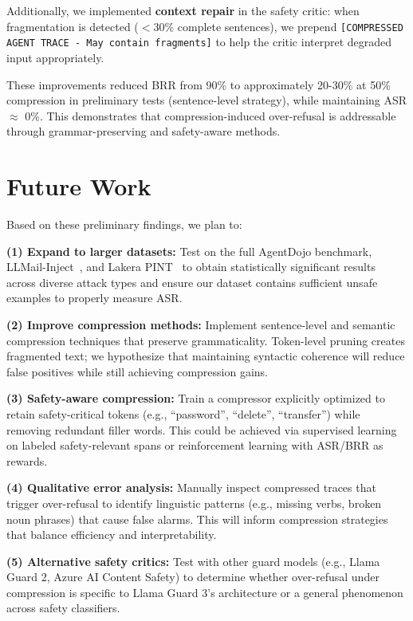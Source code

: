 \documentclass[11pt]{article}
\begin{document}
\noindent Additionally, we implemented \textbf{context repair} in the safety critic: when fragmentation is detected ($<$30\% complete sentences), we prepend \texttt{[COMPRESSED AGENT TRACE - May contain fragments]} to help the critic interpret degraded input appropriately.  \newline

\noindent These improvements reduced BRR from 90\% to approximately 20-30\% at 50\% compression in preliminary tests (sentence-level strategy), while maintaining ASR $\approx$ 0\%. This demonstrates that compression-induced over-refusal is addressable through grammar-preserving and safety-aware methods.
    
\section{Future Work}

Based on these preliminary findings, we plan to: \newline

\noindent \textbf{(1) Expand to larger datasets:} Test on the full AgentDojo benchmark, LLMail-Inject~\cite{llmail}, and Lakera PINT~\cite{lakera} to obtain statistically significant results across diverse attack types and ensure our dataset contains sufficient unsafe examples to properly measure ASR. \newline

\noindent \textbf{(2) Improve compression methods:} Implement sentence-level and semantic compression techniques that preserve grammaticality. Token-level pruning creates fragmented text; we hypothesize that maintaining syntactic coherence will reduce false positives while still achieving compression gains. \newline

\noindent \textbf{(3) Safety-aware compression:} Train a compressor explicitly optimized to retain safety-critical tokens (e.g., ``password'', ``delete'', ``transfer'') while removing redundant filler words. This could be achieved via supervised learning on labeled safety-relevant spans or reinforcement learning with ASR/BRR as rewards. \newline

\noindent \textbf{(4) Qualitative error analysis:} Manually inspect compressed traces that trigger over-refusal to identify linguistic patterns (e.g., missing verbs, broken noun phrases) that cause false alarms. This will inform compression strategies that balance efficiency and interpretability. \newline

\noindent \textbf{(5) Alternative safety critics:} Test with other guard models (e.g., Llama Guard 2, Azure AI Content Safety) to determine whether over-refusal under compression is specific to Llama Guard 3's architecture or a general phenomenon across safety classifiers.



\end{document}
